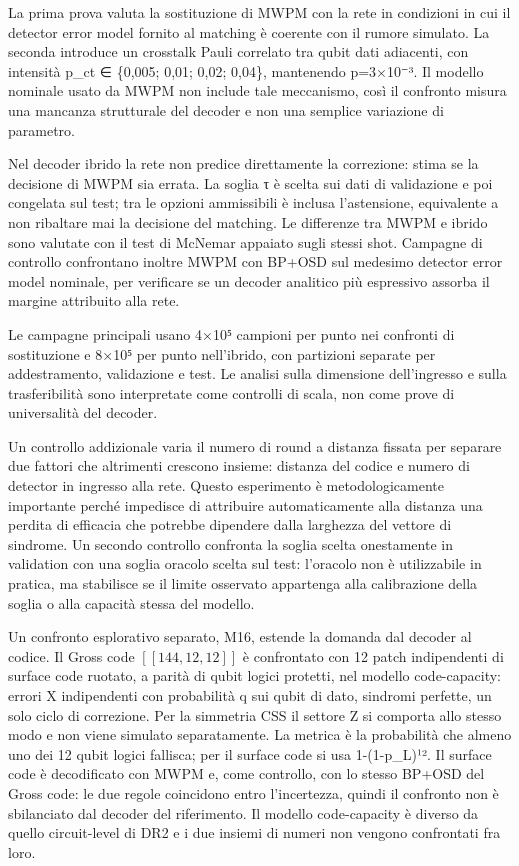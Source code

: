 La prima prova valuta la sostituzione di MWPM con la rete in condizioni in cui il detector error model fornito al matching è coerente con il rumore simulato. La seconda introduce un crosstalk Pauli correlato tra qubit dati adiacenti, con intensità p\_ct ∈ \{0,005; 0,01; 0,02; 0,04\}, mantenendo p=3×10⁻³. Il modello nominale usato da MWPM non include tale meccanismo, così il confronto misura una mancanza strutturale del decoder e non una semplice variazione di parametro.

Nel decoder ibrido la rete non predice direttamente la correzione: stima se la decisione di MWPM sia errata. La soglia τ è scelta sui dati di validazione e poi congelata sul test; tra le opzioni ammissibili è inclusa l'astensione, equivalente a non ribaltare mai la decisione del matching. Le differenze tra MWPM e ibrido sono valutate con il test di McNemar appaiato sugli stessi shot. Campagne di controllo confrontano inoltre MWPM con BP+OSD sul medesimo detector error model nominale, per verificare se un decoder analitico più espressivo assorba il margine attribuito alla rete.

Le campagne principali usano 4×10⁵ campioni per punto nei confronti di sostituzione e 8×10⁵ per punto nell'ibrido, con partizioni separate per addestramento, validazione e test. Le analisi sulla dimensione dell'ingresso e sulla trasferibilità sono interpretate come controlli di scala, non come prove di universalità del decoder.

Un controllo addizionale varia il numero di round a distanza fissata per separare due fattori che altrimenti crescono insieme: distanza del codice e numero di detector in ingresso alla rete. Questo esperimento è metodologicamente importante perché impedisce di attribuire automaticamente alla distanza una perdita di efficacia che potrebbe dipendere dalla larghezza del vettore di sindrome. Un secondo controllo confronta la soglia scelta onestamente in validation con una soglia oracolo scelta sul test: l'oracolo non è utilizzabile in pratica, ma stabilisce se il limite osservato appartenga alla calibrazione della soglia o alla capacità stessa del modello.

Un confronto esplorativo separato, M16, estende la domanda dal decoder al codice. Il Gross code \ensuremath{[[144,12,12]]} \cite{bravyi2024} è confrontato con 12 patch indipendenti di surface code ruotato, a parità di qubit logici protetti, nel modello code-capacity: errori X indipendenti con probabilità q sui qubit di dato, sindromi perfette, un solo ciclo di correzione. Per la simmetria CSS il settore Z si comporta allo stesso modo e non viene simulato separatamente. La metrica è la probabilità che almeno uno dei 12 qubit logici fallisca; per il surface code si usa 1-(1-p\_L)¹². Il surface code è decodificato con MWPM e, come controllo, con lo stesso BP+OSD del Gross code: le due regole coincidono entro l'incertezza, quindi il confronto non è sbilanciato dal decoder del riferimento. Il modello code-capacity è diverso da quello circuit-level di DR2 e i due insiemi di numeri non vengono confrontati fra loro.

